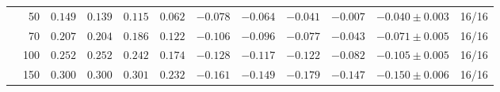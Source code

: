 \begin{tabular}{lrrrrrrrrrrr}
 & 50 & $0.149$ & $0.139$ & $0.115$ & $0.062$ & $-0.078$ & $-0.064$ & $-0.041$ & $-0.007$ & $-0.040 \pm 0.003$ & 16/16 \\
 & 70 & $0.207$ & $0.204$ & $0.186$ & $0.122$ & $-0.106$ & $-0.096$ & $-0.077$ & $-0.043$ & $-0.071 \pm 0.005$ & 16/16 \\
 & 100 & $0.252$ & $0.252$ & $0.242$ & $0.174$ & $-0.128$ & $-0.117$ & $-0.122$ & $-0.082$ & $-0.105 \pm 0.005$ & 16/16 \\
 & 150 & $0.300$ & $0.300$ & $0.301$ & $0.232$ & $-0.161$ & $-0.149$ & $-0.179$ & $-0.147$ & $-0.150 \pm 0.006$ & 16/16 \\
\bottomrule
\end{tabular}
